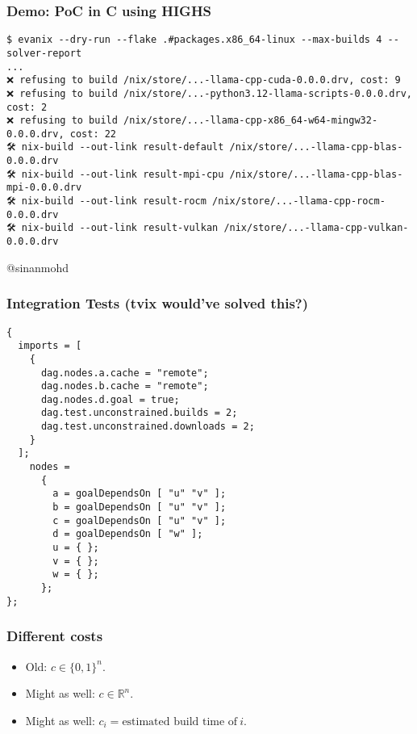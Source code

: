 \documentclass{beamer}
\begin{document}
\begin{frame}[fragile]
\frametitle{Demo: PoC in C using HIGHS}
\begin{verbatim}
$ evanix --dry-run --flake .#packages.x86_64-linux --max-builds 4 --solver-report
...
❌ refusing to build /nix/store/...-llama-cpp-cuda-0.0.0.drv, cost: 9
❌ refusing to build /nix/store/...-python3.12-llama-scripts-0.0.0.drv, cost: 2
❌ refusing to build /nix/store/...-llama-cpp-x86_64-w64-mingw32-0.0.0.drv, cost: 22
🛠️ nix-build --out-link result-default /nix/store/...-llama-cpp-blas-0.0.0.drv
🛠️ nix-build --out-link result-mpi-cpu /nix/store/...-llama-cpp-blas-mpi-0.0.0.drv
🛠️ nix-build --out-link result-rocm /nix/store/...-llama-cpp-rocm-0.0.0.drv
🛠️ nix-build --out-link result-vulkan /nix/store/...-llama-cpp-vulkan-0.0.0.drv
\end{verbatim}

@sinanmohd
\end{frame}

\begin{frame}[fragile]
\frametitle{Integration Tests (tvix would've solved this?)}
\begin{verbatim}
{
  imports = [
    {
      dag.nodes.a.cache = "remote";
      dag.nodes.b.cache = "remote";
      dag.nodes.d.goal = true;
      dag.test.unconstrained.builds = 2;
      dag.test.unconstrained.downloads = 2;
    }
  ];
    nodes =
      {
        a = goalDependsOn [ "u" "v" ];
        b = goalDependsOn [ "u" "v" ];
        c = goalDependsOn [ "u" "v" ];
        d = goalDependsOn [ "w" ];
        u = { };
        v = { };
        w = { };
      };
};
\end{verbatim}

\end{frame}

\begin{frame}
\frametitle{Different costs}

\begin{itemize}
\item Old: \( c\in\{0,1\}^n \).
\item Might as well: \( c\in\mathbb{R}^n \).
\item Might as well: \( c_i = \text{estimated build time of}~i \).
\end{itemize}
\end{frame}
\end{document}
